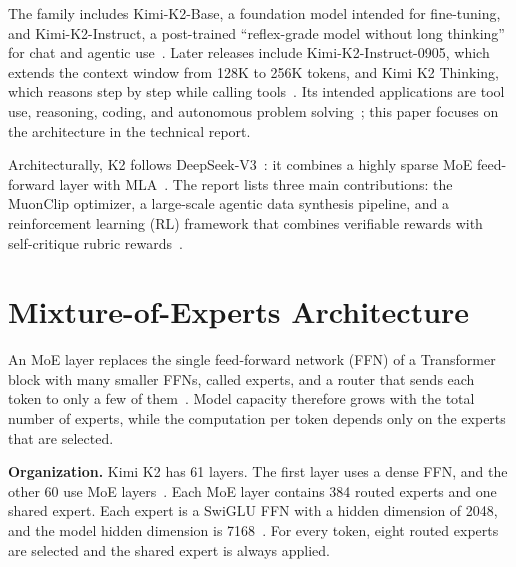 \documentclass[conference]{IEEEtran}
\begin{document}
The family includes Kimi-K2-Base, a foundation model intended for fine-tuning, and Kimi-K2-Instruct, a post-trained ``reflex-grade model without long thinking'' for chat and agentic use~\cite{kimik2github}. Later releases include Kimi-K2-Instruct-0905, which extends the context window from 128K to 256K tokens, and Kimi K2 Thinking, which reasons step by step while calling tools~\cite{kimik2thinking}. Its intended applications are tool use, reasoning, coding, and autonomous problem solving~\cite{kimik2github}; this paper focuses on the architecture in the technical report.

Architecturally, K2 follows DeepSeek-V3~\cite{deepseekv3}: it combines a highly sparse MoE feed-forward layer with MLA~\cite{deepseekv2}. The report lists three main contributions: the MuonClip optimizer, a large-scale agentic data synthesis pipeline, and a reinforcement learning (RL) framework that combines verifiable rewards with self-critique rubric rewards~\cite{kimik2}.

\section{Mixture-of-Experts Architecture}
An MoE layer replaces the single feed-forward network (FFN) of a Transformer block with many smaller FFNs, called experts, and a router that sends each token to only a few of them~\cite{shazeer2017}. Model capacity therefore grows with the total number of experts, while the computation per token depends only on the experts that are selected.

\textbf{Organization.} Kimi K2 has 61 layers. The first layer uses a dense FFN, and the other 60 use MoE layers~\cite{kimik2}. Each MoE layer contains 384 routed experts and one shared expert. Each expert is a SwiGLU FFN with a hidden dimension of 2048, and the model hidden dimension is 7168~\cite{kimik2,kimik2github}. For every token, eight routed experts are selected and the shared expert is always applied.
\end{document}

